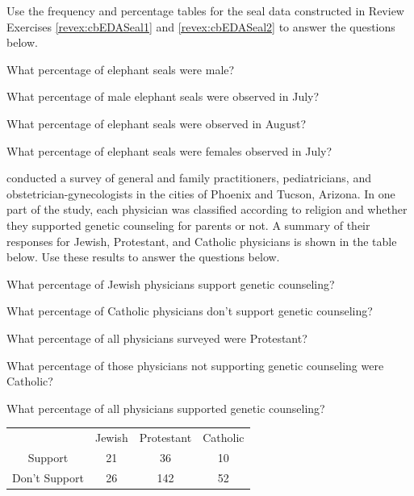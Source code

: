 \documentclass[10pt,openany]{book}\usepackage[]{graphicx}\usepackage[]{color}
\begin{document}
\begin{exsection}
  \item \label{revex:cbEDASeal3} Use the frequency and percentage tables for the seal data constructed in Review Exercises \ref{revex:cbEDASeal1} and \ref{revex:cbEDASeal2} to answer the questions below. 
  \begin{Enumerate}
    \item What percentage of elephant seals were male?
    \item What percentage of male elephant seals were observed in July?
    \item What percentage of elephant seals were observed in August?
    \item What percentage of elephant seals were females observed in July?
  \end{Enumerate}

  \item \label{revex:cbEDAWeitz} \cite{Weitz1979} conducted a survey of general and family practitioners, pediatricians, and obstetrician-gynecologists in the cities of Phoenix and Tucson, Arizona.  In one part of the study, each physician was classified according to religion and whether they supported genetic counseling for parents or not.  A summary of their responses for Jewish, Protestant, and Catholic physicians is shown in the table below.  Use these results to answer the questions below.  
  \begin{Enumerate}
    \item What percentage of Jewish physicians support genetic counseling?
    \item What percentage of Catholic physicians don't support genetic counseling?
    \item What percentage of all physicians surveyed were Protestant?
    \item What percentage of those physicians not supporting genetic counseling were Catholic?
    \item What percentage of all physicians supported genetic counseling?
  \end{Enumerate}
  \begin{center}
    \begin{tabular}{c|ccc|}
      \hline\hline
      \multicolumn{1}{c}{} & Jewish & Protestant & \multicolumn{1}{c}{Catholic} \\
      \cline{2-4}
      Support & 21 & 36 & 10 \\
      Don't Support & 26 & 142 & 52 \\
      \hline\hline
    \end{tabular}
  \end{center}


\end{exsection}
\end{document}
